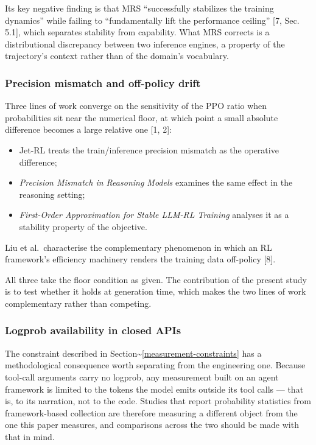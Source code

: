 \documentclass[
  11pt,
]{article}
\providecommand{\tightlist}{%
  \setlength{\itemsep}{0pt}\setlength{\parskip}{0pt}}
\begin{document}
Its key negative finding is that MRS ``successfully stabilizes the
training dynamics'' while failing to ``fundamentally lift the
performance ceiling'' {[}7, Sec. 5.1{]}, which separates stability from
capability. What MRS corrects is a distributional discrepancy between
two inference engines, a property of the trajectory's context rather
than of the domain's vocabulary.

\hypertarget{precision-mismatch-and-off-policy-drift}{%
\subsubsection{Precision mismatch and off-policy
drift}\label{precision-mismatch-and-off-policy-drift}}

Three lines of work converge on the sensitivity of the PPO ratio when
probabilities sit near the numerical floor, at which point a small
absolute difference becomes a large relative one {[}1, 2{]}:

\begin{itemize}
\tightlist
\item
  Jet-RL treats the train/inference precision mismatch as the operative
  difference;
\item
  \emph{Precision Mismatch in Reasoning Models} examines the same effect
  in the reasoning setting;
\item
  \emph{First-Order Approximation for Stable LLM-RL Training} analyses
  it as a stability property of the objective.
\end{itemize}

Liu et al.~characterise the complementary phenomenon in which an RL
framework's efficiency machinery renders the training data off-policy
{[}8{]}.

All three take the floor condition as given. The contribution of the
present study is to test whether it holds at generation time, which
makes the two lines of work complementary rather than competing.

\hypertarget{logprob-availability-in-closed-apis}{%
\subsubsection{Logprob availability in closed
APIs}\label{logprob-availability-in-closed-apis}}

The constraint described in
Section\textasciitilde{}\ref{measurement-constraints} has a
methodological consequence worth separating from the engineering one.
Because tool-call arguments carry no logprob, any measurement built on
an agent framework is limited to the tokens the model emits outside its
tool calls --- that is, to its narration, not to the code. Studies that
report probability statistics from framework-based collection are
therefore measuring a different object from the one this paper measures,
and comparisons across the two should be made with that in mind.
\end{document}
